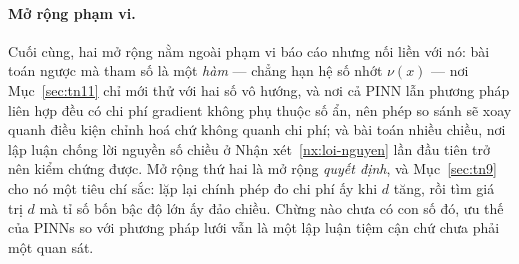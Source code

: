 \paragraph{Mở rộng phạm vi.} Cuối cùng, hai mở rộng nằm ngoài phạm vi báo cáo
nhưng nối liền với nó: bài toán ngược mà tham số là một \emph{hàm} --- chẳng hạn
hệ số nhớt $\nu(x)$ --- nơi Mục~\ref{sec:tn11} chỉ mới thử với hai số vô hướng, và
nơi cả PINN lẫn phương pháp liên hợp đều có chi phí gradient không phụ thuộc số
ẩn, nên phép so sánh sẽ xoay quanh điều kiện chỉnh hoá chứ không quanh chi phí;
và bài toán nhiều chiều, nơi lập luận chống lời
nguyền số chiều ở Nhận xét~\ref{nx:loi-nguyen} lần đầu tiên trở nên kiểm chứng
được. Mở rộng thứ hai là mở rộng \emph{quyết định}, và Mục~\ref{sec:tn9} cho nó
một tiêu chí sắc: lặp lại chính phép đo chi phí ấy khi $d$ tăng, rồi tìm giá trị
$d$ mà tỉ số bốn bậc độ lớn ấy đảo chiều. Chừng nào chưa có con số đó, ưu thế của PINNs
so với phương pháp lưới vẫn là một lập luận tiệm cận chứ chưa phải một quan sát.
